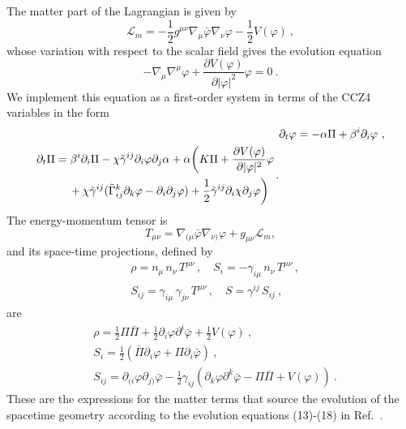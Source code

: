 \documentclass[11pt]{report}  %
\begin{document}
The matter part of the Lagrangian is given by
\begin{equation}
\mathcal{L}_m=-\frac{1}{2}g^{\mu\nu}\nabla_{\mu}{\bar{\varphi}}\nabla_{\nu}{\varphi}-\frac{1}{2} V(\varphi)~,
\end{equation}
whose variation with respect to the scalar field gives the evolution equation
\begin{equation}
-\nabla_\mu \nabla^\mu\varphi+\frac{\partial V(\varphi)}{\partial \vert{\varphi}\vert^2}\varphi=0~.
\end{equation}
We implement this equation as a first-order system in
terms of the CCZ4 variables in the form 
\begin{align}
&\partial_t \varphi = -\alpha \Pi +\beta^i\partial_i \varphi  ~ , \\
\begin{split} &\partial_t \Pi = \beta^i \partial_i \Pi - \chi \tilde{\gamma}^{ij}\partial_i \varphi \partial_j \alpha + \alpha\bigg( K\Pi + \frac{\partial V(\varphi)}{\partial \vert \varphi \vert^2}\varphi  \\
&\hspace{1.0cm} +  \chi\tilde{\gamma}^{ij}(\tilde{\Gamma}^k_{ij}\partial_k \varphi-\partial_i\partial_j \varphi)  + \frac{1}{2} \tilde{\gamma}^{ij}\partial_i \chi \partial_j \varphi\bigg) \end{split}\,.
\end{align}
The energy-momentum tensor is
\begin{equation}
T_{\mu\nu} =
\nabla_{(\mu}\bar{\varphi}\nabla_{\nu)}\varphi+g_{\mu\nu}\mathcal{L}_m,
\end{equation}
and its space-time projections, defined by
\begin{align} \label{eq:Mattersources}
&\rho = n_\mu \,n_\nu\,T^{\mu \nu}\,,\quad S_i = -\gamma_{i\mu }\,n_\nu\,T^{\mu \nu}\,, \nonumber \\
&S_{ij} = \gamma_{i\mu }\,\gamma_{j\nu}\,T^{\mu \nu}\,,\quad S = \gamma^{ij}\,S_{ij} ~,
\end{align}
are  
\begin{align} \label{eq:Mattereqns}
&\rho = \frac{1}{2}\Pi  \bar{\Pi} + \frac{1}{2} \partial_{i} \varphi \partial^{i} \bar{\varphi} +\frac{1}{2}V(\varphi)~, \\ 
&S_i  = \frac{1}{2}\left(\bar{\Pi} \partial_{i} \varphi + {\Pi} \partial_{i} \bar{\varphi} \right)  ~,
\label{eq:Si} \\
&S_{ij} = \partial_{(i} \varphi \partial_{j)} \bar{\varphi}  -  \frac{1}{2} \gamma_{ij}\left( \partial_{k} \varphi \partial^{k} \bar{\varphi}-\Pi  \bar{\Pi} + V(\varphi)\right) ~.
\end{align}
%
These are the expressions for the matter terms that source
the evolution of the spacetime geometry according to the
evolution equations (13)-(18) in Ref.~\cite{Radia:2021smk}.
\end{document}
